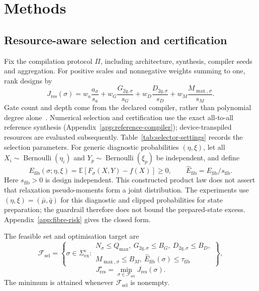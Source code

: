 \documentclass[a4paper,onecolumn,11pt,unpublished]{quantumarticle}
\theoremstyle{remark}
\begin{document}
\section{Methods}
\label{sec:methodology}
\label{sec:experiments}

\subsection{Resource-aware selection and certification}
\label{sec:selection}
\label{sec:selection-problem}
\label{sec:search-certification}

Fix the compilation protocol $\Pi$, including architecture, synthesis,
compiler seeds and aggregation. For positive scales and nonnegative weights
summing to one, rank designs by
\begin{equation}
J_{\mathrm{res}}(\sigma)=
w_a\frac{a_\sigma}{s_a}+w_G\frac{G_{2q,\sigma}}{s_G}
+w_D\frac{D_{2q,\sigma}}{s_D}+w_M\frac{M_{\max,\sigma}}{s_M}.
\label{eq:Jres}
\end{equation}
Gate count and depth come from the declared compiler, rather than polynomial
degree alone~\cite{Verchere2023,Weidenfeller2022,Schmidbauer2024}.
Numerical selection and certification use the exact all-to-all reference
synthesis (Appendix~\ref{app:reference-compiler}); device-transpiled
resources are evaluated subsequently. Table~\ref{tab:selector-settings}
records the selection parameters.
For generic diagnostic probabilities $(\eta,\xi)$, let all
$X_i\sim\operatorname{Bernoulli}(\eta_i)$ and
$Y_p\sim\operatorname{Bernoulli}(\xi_p)$ be independent, and define
\begin{equation}
E_{\mathrm{fib}}(\sigma;\eta,\xi)=\mathbb E[F_\sigma(X,Y)-f(X)]\geq0,
\qquad \widehat E_{\mathrm{fib}}=E_{\mathrm{fib}}/s_{\mathrm{fib}}.
\label{eq:fibre-excess-short}
\end{equation}
Here $s_{\mathrm{fib}}>0$ is design independent. This constructed product law
does not assert that relaxation pseudo-moments form a joint distribution.
The experiments use $(\eta,\xi)=(\bar\mu,\bar q)$ for this diagnostic and clipped
probabilities for state preparation; the guardrail therefore does not bound
the prepared-state excess. Appendix~\ref{app:fibre-risk} gives the closed form.

The feasible set and optimisation target are
\begin{equation}
\mathcal F_{\mathrm{sel}}=\left\{\sigma\in\Sigma_{\mathrm{ex}}^\varepsilon:
\begin{array}{c}
N_\sigma\leq Q_{\max},\ G_{2q,\sigma}\leq B_G,\ D_{2q,\sigma}\leq B_D,\\
M_{\max,\sigma}\leq B_M,\ \widehat E_{\mathrm{fib}}(\sigma)\leq\tau_{\mathrm{fib}}
\end{array}\right\},
\label{eq:selection-feasible-set}
\end{equation}
\begin{equation}
J_{\mathrm{res}}^\star=\min_{\sigma\in\mathcal F_{\mathrm{sel}}}J_{\mathrm{res}}(\sigma).
\label{eq:selection-problem}
\end{equation}
The minimum is attained whenever $\mathcal F_{\mathrm{sel}}$ is nonempty.
\end{document}
